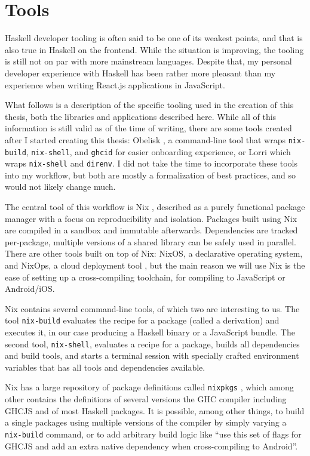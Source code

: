 \documentclass[english,odsaz]{fitthesis}
\begin{document}
\section{Tools}
\label{sec:org0450b90}
Haskell developer tooling is often said to be one of its weakest points, and
that is also true in Haskell on the frontend. While the situation is improving,
the tooling is still not on par with more mainstream languages. Despite that, my
personal developer experience with Haskell has been rather more pleasant than my
experience when writing React.js applications in JavaScript.

What follows is a description of the specific tooling used in the creation of
this thesis, both the libraries and applications described here. While all of
this information is still valid as of the time of writing, there are some tools
created after I started creating this thesis: Obelisk \cite{obelisk}, a
command-line tool that wraps \texttt{nix-build}, \texttt{nix-shell}, and \texttt{ghcid} for easier
onboarding experience, or Lorri \cite{lorri} which wraps \texttt{nix-shell} and \texttt{direnv}. I
did not take the time to incorporate these tools into my workflow, but both are
mostly a formalization of best practices, and so would not likely change much.

The central tool of this workflow is Nix \cite{dolstra2006purely}, described as a
purely functional package manager with a focus on reproducibility and
isolation. Packages built using Nix are compiled in a sandbox and immutable
afterwards. Dependencies are tracked per-package, multiple versions of a shared
library can be safely used in parallel. There are other tools built on top of
Nix: NixOS, a declarative operating system, and NixOps, a cloud deployment tool
\cite{dolstra2008nixos}, but the main reason we will use Nix is the ease of
setting up a cross-compiling toolchain, for compiling to JavaScript or
Android/iOS.

Nix contains several command-line tools, of which two are interesting
to us. The tool \texttt{nix-build} evaluates the recipe for a package (called a
derivation) and executes it, in our case producing a Haskell binary or a
JavaScript bundle. The second tool, \texttt{nix-shell}, evaluates a recipe for a package,
builds all dependencies and build tools, and starts a terminal session with
specially crafted environment variables that has all tools and dependencies
available.

Nix has a large repository of package definitions called \texttt{nixpkgs} \cite{nixpkgs},
which among other contains the definitions of several versions the GHC compiler
including GHCJS and of most Haskell packages. It is possible, among other
things, to build a single packages using multiple versions of the compiler by
simply varying a \texttt{nix-build} command, or to add arbitrary build logic like ``use
this set of flags for GHCJS and add an extra native dependency when
cross-compiling to Android''.
\end{document}
